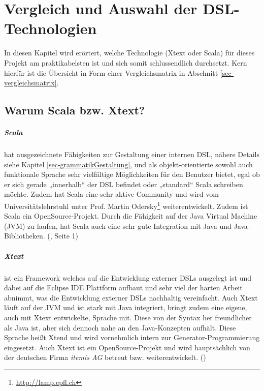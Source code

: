 \chapter{Vergleich und Auswahl der DSL-Technologien}

In diesen Kapitel wird erörtert, welche Technologie (Xtext oder Scala) für
dieses Projekt am praktikabelsten ist und sich somit schlussendlich durchsetzt.
Kern hierfür ist die Übersicht in Form einer Vergleichsmatrix in Abschnitt
\ref{sec-vergleichsmatrix}.

\section{Warum Scala bzw. Xtext?}\label{sec-warumAusgewaehlt}

\paragraph{Scala}
hat ausgezeichnete Fähigkeiten zur Gestaltung einer
internen DSL, nähere Details siehe Kapitel \ref{sec-grammatikGestaltung},
und als objekt-orientierte sowohl auch funktionale Sprache sehr
vielfältige Möglichkeiten für den Benutzer bietet, egal ob er sich
gerade „innerhalb“ der DSL befindet oder „standard“ Scala schreiben
möchte. Zudem hat Scala eine sehr aktive Community und wird vom
Universitätslehrstuhl unter Prof. Martin
Odersky\footnote{\url{http://lamp.epfl.ch}} weiterentwickelt.
Zudem ist Scala ein OpenSource-Projekt.
Durch die Fähigkeit auf der Java Virtual Machine (JVM) zu laufen,
hat Scala auch eine sehr gute Integration mit Java und
Java-Bibliotheken. (\cite{scala-ref}, Seite 1)

\paragraph{Xtext} ist ein Framework welches auf die Entwicklung externer DSLs
ausgelegt ist und dabei auf die Eclipse IDE Plattform aufbaut
und sehr viel der harten Arbeit abnimmt, was die Entwicklung
externer DSLs nachhaltig vereinfacht.
Auch Xtext läuft auf der JVM und ist stark mit Java integriert, bringt
zudem eine eigene, auch mit Xtext entwickelte, Sprache mit. Diese von der
Syntax her freundlicher als Java ist, aber sich dennoch nahe an den
Java-Konzepten aufhält. Diese Sprache heißt Xtend und wird vornehmlich
intern zur Generator-Programmierung eingesetzt.
Auch Xtext ist ein OpenSource-Projekt und wird hauptsächlich von der
deutschen Firma \emph{itemis AG} betreut bzw. weiterentwickelt. (\cite{xtext})

